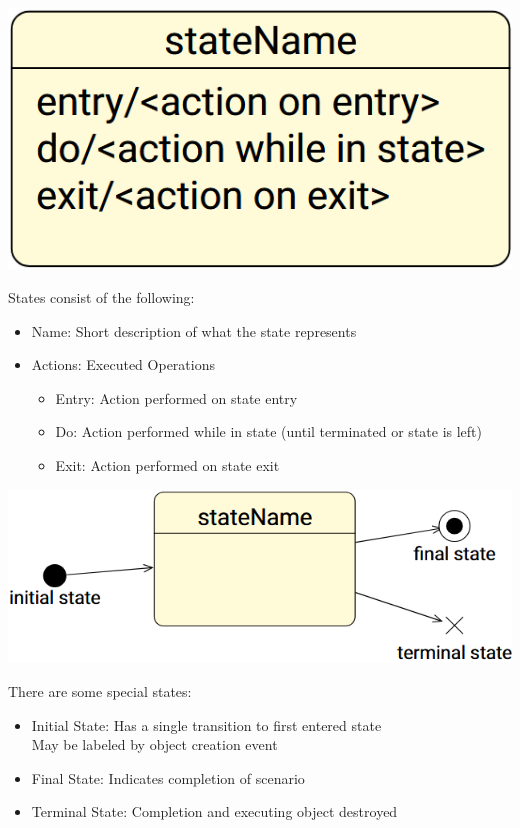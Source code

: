 \documentclass[
../../Software_Engineering_Summary.tex,
]
{subfiles}
\begin{document}
\begin{defbox}
    \begin{center}
        \includegraphics[scale=0.3]{Pics/04/BehaviourBasicStates.png}
    \end{center}
    States consist of the following:
    \begin{itemize}
        \item Name: Short description of what the state represents
        \item Actions: Executed Operations
        \begin{itemize}
            \item Entry: Action performed on state entry
            \item Do: Action performed while in state (until terminated or state is left)
            \item Exit: Action performed on state exit
        \end{itemize}
    \end{itemize}
\end{defbox}

\begin{defbox}
    \begin{center}
        \includegraphics[scale=0.5]{Pics/04/BehaviourSpecialStates.png}
    \end{center}
    There are some special states:
    \begin{itemize}
        \item Initial State: Has a single transition to first entered state \\
        May be labeled by object creation event
        \item Final State: Indicates completion of scenario
        \item Terminal State: Completion and executing object destroyed
    \end{itemize}
\end{defbox}
\end{document}
